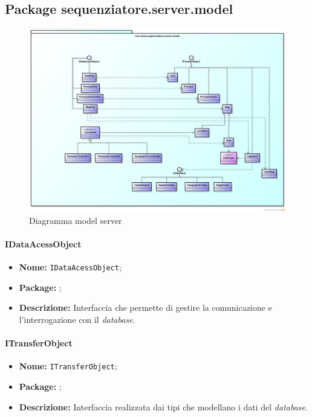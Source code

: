 \subsection{Package sequenziatore.server.model}
\begin{figure}[H] \centering \includegraphics[width=%
\textwidth]
{./pack/ClassiServerSoloModel.png} \caption{Diagramma model server}
\end{figure}

\paragraph{IDataAcessObject}
\begin{itemize}
\item \textbf{Nome:} \texttt{IDataAcessObject};
\item \textbf{Package:} \texttt{\smodel{}};
\item \textbf{Descrizione:} Interfaccia che permette di gestire la comunicazione e l'interrogazione con il \textit{database}.
\end{itemize}

\paragraph{ITransferObject}
\begin{itemize}
\item \textbf{Nome:} \texttt{ITransferObject};
\item \textbf{Package:} \texttt{\smodel{}};
\item \textbf{Descrizione:} Interfaccia realizzata dai tipi che modellano i dati del \textit{database}.
\end{itemize}

